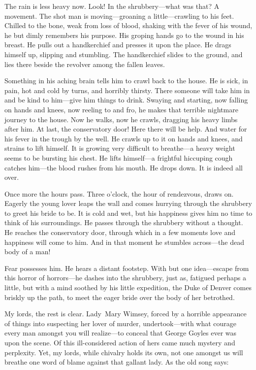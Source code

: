 \begin{dialogue}
The rain is less heavy now. Look! In the shrubbery—what was that? A movement. The shot man is moving—groaning a little—crawling to his feet. Chilled to the bone, weak from loss of blood, shaking with the fever of his wound, he but dimly remembers his purpose. His groping hands go to the wound in his breast. He pulls out a handkerchief and presses it upon the place. He drags himself up, slipping and stumbling. The handkerchief slides to the ground, and lies there beside the revolver among the fallen leaves.

\smallskip

Something in his aching brain tells him to crawl back to the house. He is sick, in pain, hot and cold by turns, and horribly thirsty. There someone will take him in and be kind to him—give him things to drink. Swaying and starting, now falling on hands and knees, now reeling to and fro, he makes that terrible nightmare journey to the house. Now he walks, now he crawls, dragging his heavy limbs after him. At last, the conservatory door! Here there will be help. And water for his fever in the trough by the well. He crawls up to it on hands and knees, and strains to lift himself. It is growing very difficult to breathe—a heavy weight seems to be bursting his chest. He lifts himself—a frightful hiccuping cough catches him—the blood rushes from his mouth. He drops down. It is indeed all over.

\smallskip

Once more the hours pass. Three o'clock, the hour of rendezvous, draws on. Eagerly the young lover leaps the wall and comes hurrying through the shrubbery to greet his bride to be. It is cold and wet, but his happiness gives him no time to think of his surroundings. He passes through the shrubbery without a thought. He reaches the conservatory door, through which in a few moments love and happiness will come to him. And in that moment he stumbles across—the dead body of a man!

\smallskip

Fear possesses him. He hears a distant footstep. With but one idea—escape from this horror of horrors—he dashes into the shrubbery, just as, fatigued perhaps a little, but with a mind soothed by his little expedition, the Duke of Denver comes briskly up the path, to meet the eager bride over the body of her betrothed.

\smallskip

My lords, the rest is clear. Lady~Mary Wimsey, forced by a horrible appearance of things into suspecting her lover of murder, undertook—with what courage every man amongst you will realize—to conceal that George Goyles ever was upon the scene. Of this ill-considered action of hers came much mystery and perplexity. Yet, my lords, while chivalry holds its own, not one amongst us will breathe one word of blame against that gallant lady. As the old song says:


\end{dialogue}
